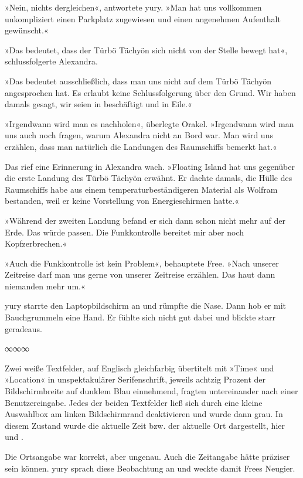 »Nein, nichts dergleichen«, antwortete yury. »Man hat uns vollkommen unkompliziert einen Parkplatz zugewiesen und einen angenehmen Aufenthalt gewünscht.«

»Das bedeutet, dass der Türbö Tächyön sich nicht von der Stelle bewegt hat«, schlussfolgerte Alexandra.

»Das bedeutet ausschließlich, dass man uns nicht auf dem Türbö Tächyön angesprochen hat. Es erlaubt keine Schlussfolgerung über den Grund. Wir haben damals gesagt, wir seien in beschäftigt und in Eile.«

»Irgendwann wird man es nachholen«, überlegte Orakel. »Irgendwann wird man uns auch noch fragen, warum Alexandra nicht an Bord war. Man wird uns erzählen, dass man natürlich die Landungen des Raumschiffs bemerkt hat.«

Das rief eine Erinnerung in Alexandra wach. »Floating Island hat uns gegenüber die erste Landung des Türbö Tächyön erwähnt. Er dachte damals, die Hülle des Raumschiffs habe aus einem temperaturbeständigeren Material als Wolfram bestanden, weil er keine Vorstellung von Energieschirmen hatte.«

»Während der zweiten Landung befand er sich dann schon nicht mehr auf der Erde. Das würde passen. Die Funkkontrolle bereitet mir aber noch Kopfzerbrechen.«

»Auch die Funkkontrolle ist kein Problem«, behauptete Free. »Nach unserer Zeitreise darf man uns gerne von unserer Zeitreise erzählen. Das haut dann niemanden mehr um.«

yury starrte den Laptopbildschirm an und rümpfte die Nase. Dann hob er mit Bauchgrummeln eine Hand. Er fühlte sich nicht gut dabei und blickte starr geradeaus.

\begin{center}
∞∞∞
\end{center}

Zwei weiße Textfelder, auf Englisch gleichfarbig übertitelt mit »Time« und »Location« in unspektakulärer Serifenschrift, jeweils achtzig Prozent der Bildschirmbreite auf dunklem Blau einnehmend, fragten untereinander nach einer Benutzereingabe. Jedes der beiden Textfelder ließ sich durch eine kleine Auswahlbox am linken Bildschirmrand deaktivieren und wurde dann grau. In diesem Zustand wurde die aktuelle Zeit bzw. der aktuelle Ort dargestellt, hier  und .

Die Ortsangabe war korrekt, aber ungenau. Auch die Zeitangabe hätte präziser sein können. yury sprach diese Beobachtung an und weckte damit Frees Neugier.

